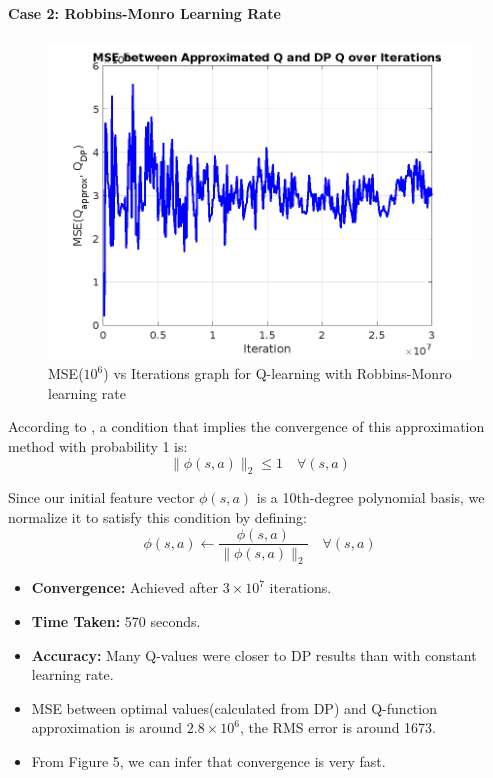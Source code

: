 \documentclass[10pt,twocolumn,letterpaper]{article}
\begin{document}
\paragraph{Case 2: Robbins-Monro Learning Rate}
\begin{figure}
    \centering
    \includegraphics[width=1\linewidth]{MSE_rb_fa.png}
    \caption{MSE($10^6$) vs Iterations graph for Q-learning with Robbins-Monro learning rate}
    \label{fig:enter-label}
\end{figure}
According to \cite{ieee_qlearning}, a condition that implies the convergence of this approximation method with probability 1 is:
\[
\|\phi(s, a)\|_2 \leq 1 \quad \forall (s,a)
\]

Since our initial feature vector \(\phi(s,a)\) is a 10th-degree polynomial basis, we normalize it to satisfy this condition by defining:
\[
\phi(s, a) \leftarrow \frac{\phi(s, a)}{\|\phi(s, a)\|_2} \quad \forall (s,a)
\]

\begin{itemize}
    \item \textbf{Convergence:} Achieved after $3 \times 10^7$ iterations.
    \item \textbf{Time Taken:} 570 seconds.
    \item \textbf{Accuracy:} Many Q-values were closer to DP results than with constant learning rate.
    \item MSE between optimal values(calculated from DP) and Q-function approximation is around $2.8\times10^6$, the RMS error is around 1673.
    \item From Figure 5, we can infer that convergence is very fast.
\end{itemize}
\end{document}
